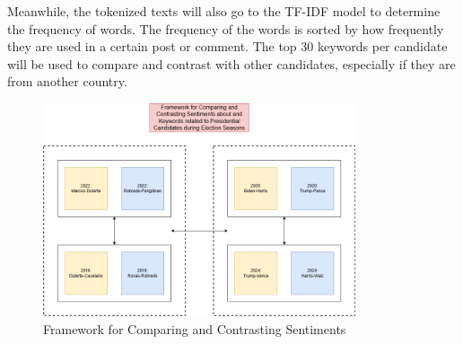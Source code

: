 Meanwhile, the tokenized texts will also go to the TF-IDF model to determine the frequency of words. The frequency of the words is sorted by how frequently they are used in a certain post or comment. The top 30 keywords per candidate will be used to compare and contrast with other candidates, especially if they are from another country.

\begin{figure}[H]
    \centering
    \includegraphics[width=0.82\textwidth]{Figures/methodology_framework-for-comparing.png}
    \caption{Framework for Comparing and Contrasting Sentiments}
    \label{fig:Framework-for-sentiments}
\end{figure}